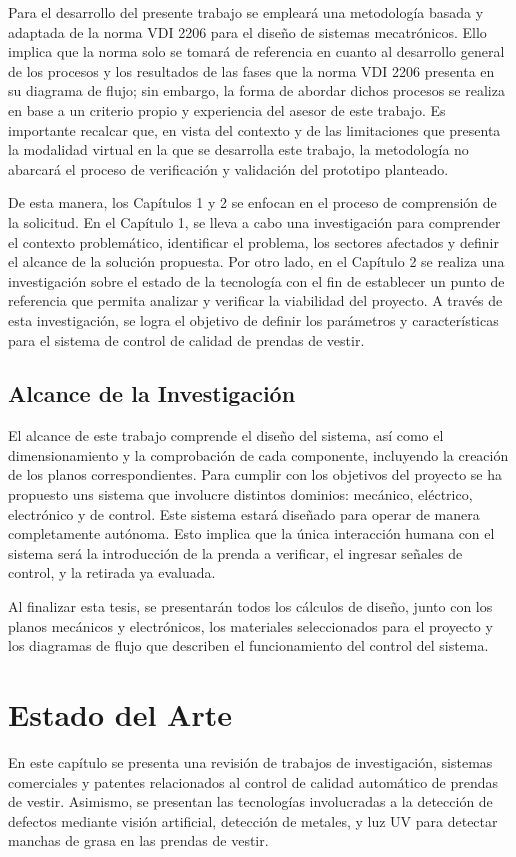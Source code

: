 Para el desarrollo del presente trabajo se empleará una metodología basada y adaptada de la norma VDI 2206 para el diseño de sistemas mecatrónicos. Ello implica que la norma solo se tomará de referencia en cuanto al desarrollo general de los procesos y los resultados de las fases que la norma VDI 2206 presenta en su diagrama de flujo; sin embargo, la forma de abordar dichos procesos se realiza en base a un criterio propio y experiencia del asesor de este trabajo. Es importante recalcar que, en vista del contexto y de las limitaciones que presenta la modalidad virtual en la que se desarrolla este trabajo, la metodología no abarcará el proceso de verificación y validación del prototipo planteado.

De esta manera, los Capítulos 1 y 2 se enfocan en el proceso de comprensión de la solicitud. En el Capítulo 1, se lleva a cabo una investigación para comprender el contexto problemático, identificar el problema, los sectores afectados y definir el alcance de la solución propuesta. Por otro lado, en el Capítulo 2 se realiza una investigación sobre el estado de la tecnología con el fin de establecer un punto de referencia que permita analizar y verificar la viabilidad del proyecto. A través de esta investigación, se logra el objetivo de definir los parámetros y características para el sistema de control de calidad de prendas de vestir.

\section{Alcance de la Investigación}

El alcance de este trabajo comprende el diseño del sistema, así como el dimensionamiento y la comprobación de cada componente, incluyendo la creación de los planos correspondientes. Para cumplir con los objetivos del proyecto se ha propuesto uns sistema que involucre distintos dominios: mecánico, eléctrico, electrónico y de control. Este sistema estará diseñado para operar de manera completamente autónoma. Esto implica que la única interacción humana con el sistema será la introducción de la prenda a verificar, el ingresar señales de control, y la retirada ya evaluada.

Al finalizar esta tesis, se presentarán todos los cálculos de diseño, junto con los planos mecánicos y electrónicos, los materiales seleccionados para el proyecto y los diagramas de flujo que describen el funcionamiento del control del sistema.

\chapter{Estado del Arte}
En este capítulo se presenta una revisión de trabajos de investigación, sistemas comerciales y patentes relacionados al control de calidad automático de prendas de vestir. Asimismo, se presentan las tecnologías involucradas a la detección de defectos mediante visión artificial, detección de metales, y luz UV para detectar manchas de grasa en las prendas de vestir.

